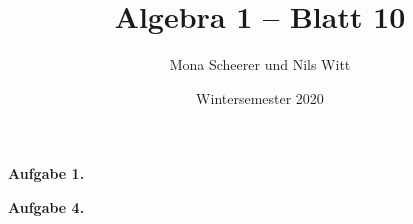 \documentclass{scrartcl}
\title{Algebra 1 -- Blatt 10}
\date{Wintersemester 2020}
\author{Mona Scheerer und Nils Witt}
\begin{document}
\maketitle
    \textbf{Aufgabe 1.} 
     
    
    \medskip
    
    \textbf{Aufgabe 4.}
    
\end{document}
